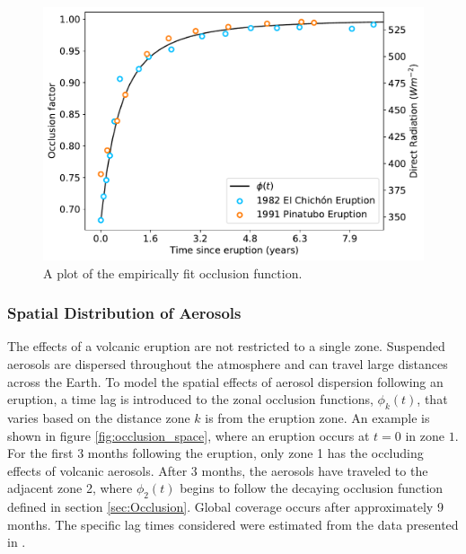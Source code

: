 \documentclass[12pt]{article}
\begin{document}
\begin{figure}[H]
    \centering
    \includegraphics[scale=0.6]{occlusion.pdf}
    \caption{
        A plot of the empirically fit occlusion function.
    }
    \label{fig:occlusion}
\end{figure}
\FloatBarrier

\subsubsection{Spatial Distribution of Aerosols} \label{sec:Spatial_Occlusion}
The effects of a volcanic eruption are not restricted to a single zone. Suspended
aerosols are dispersed throughout the atmosphere and can travel large distances
across the Earth. To model the spatial effects of aerosol dispersion following
an eruption, a time lag is introduced to the zonal occlusion functions,
$\phi_k(t)$, that varies based on the distance zone $k$ is from the eruption
zone. An example is shown in figure \ref{fig:occlusion_space}, where an eruption
occurs at $t=0$ in zone $1$. For the first $3$ months following the eruption,
only zone 1 has the occluding effects of volcanic aerosols. After $3$ months,
the aerosols have traveled to the adjacent zone 2, where $\phi_2(t)$ begins
to follow the decaying occlusion function defined in section \ref{sec:Occlusion}.
Global coverage occurs after approximately 9 months. The specific lag times considered
were estimated from the data presented in \cite{robock}.
\end{document}
